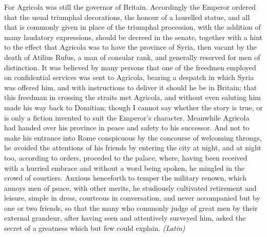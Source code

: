 
For Agricola was still the governor of Britain. Accordingly the Emperor ordered that the usual triumphal decorations, the honour of a laurelled statue, and all that is commonly given in place of the triumphal procession, with the addition of many laudatory expressions, should be decreed in the senate, together with a hint to the effect that Agricola was to have the province of Syria, then vacant by the death of Atilius Rufus, a man of consular rank, and generally reserved for men of distinction. It was believed by many persons that one of the freedmen employed on confidential services was sent to Agricola, bearing a despatch in which Syria was offered him, and with instructions to deliver it should he be in Britain; that this freedman in crossing the straits met Agricola, and without even saluting him made his way back to Domitian; though I cannot say whether the story is true, or is only a fiction invented to suit the Emperor's character. Meanwhile Agricola had handed over his province in peace and safety to his successor. And not to make his entrance into Rome conspicuous by the concourse of welcoming throngs, he avoided the attentions of his friends by entering the city at night, and at night too, according to orders, proceded to the palace, where, having been received with a hurried embrace and without a word being spoken, he mingled in the crowd of courtiers. Anxious henceforth to temper the military renown, which annoys men of peace, with other merits, he studiously cultivated retirement and leisure, simple in dress, courteous in conversation, and never accompanied but by one or two friends, so that the many who commonly judge of great men by their external grandeur, after having seen and attentively surveyed him, asked the secret of a greatness which but few could explain. \emph{(Latin)}



